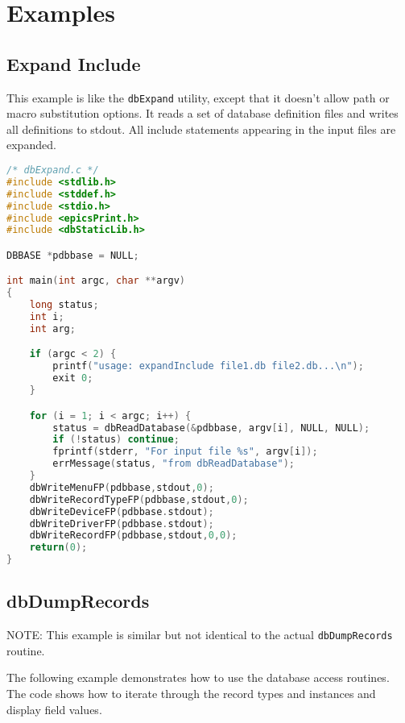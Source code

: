 \section{Examples}

\subsection{Expand Include}

This example is like the \verb|dbExpand| utility, except that it doesn't allow path or macro substitution options.
It reads a set of database definition files and writes all definitions to stdout.
All include statements appearing in the input files are expanded.

\begin{lstlisting}[language=C]
/* dbExpand.c */
#include <stdlib.h>
#include <stddef.h>
#include <stdio.h>
#include <epicsPrint.h>
#include <dbStaticLib.h>

DBBASE *pdbbase = NULL;

int main(int argc, char **argv)
{
    long status;
    int i;
    int arg;

    if (argc < 2) {
        printf("usage: expandInclude file1.db file2.db...\n");
        exit 0;
    }

    for (i = 1; i < argc; i++) {
        status = dbReadDatabase(&pdbbase, argv[i], NULL, NULL);
        if (!status) continue;
        fprintf(stderr, "For input file %s", argv[i]);
        errMessage(status, "from dbReadDatabase");
    }
    dbWriteMenuFP(pdbbase,stdout,0);
    dbWriteRecordTypeFP(pdbbase,stdout,0);
    dbWriteDeviceFP(pdbbase.stdout);
    dbWriteDriverFP(pdbbase.stdout);
    dbWriteRecordFP(pdbbase,stdout,0,0);
    return(0);
}

\end{lstlisting}

\subsection{dbDumpRecords}

NOTE: This example is similar but not identical to the actual \verb|dbDumpRecords| routine.

The following example demonstrates how to use the database access routines.
The code shows how to iterate through the record types and instances and display field values.

